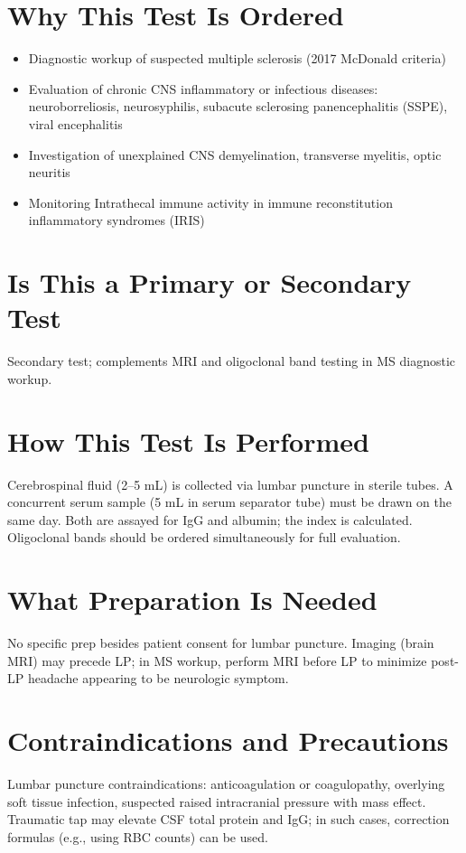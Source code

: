 \section*{Why This Test Is Ordered}
\begin{itemize}
  \item Diagnostic workup of suspected multiple sclerosis (2017 McDonald criteria)
  \item Evaluation of chronic CNS inflammatory or infectious diseases: neuroborreliosis, neurosyphilis, subacute sclerosing panencephalitis (SSPE), viral encephalitis
  \item Investigation of unexplained CNS demyelination, transverse myelitis, optic neuritis
  \item Monitoring Intrathecal immune activity in immune reconstitution inflammatory syndromes (IRIS)
\end{itemize}

\section*{Is This a Primary or Secondary Test}
Secondary test; complements MRI and oligoclonal band testing in MS diagnostic workup.

\section*{How This Test Is Performed}
Cerebrospinal fluid (2--5 mL) is collected via lumbar puncture in sterile tubes. A concurrent serum sample (5 mL in serum separator tube) must be drawn on the same day. Both are assayed for IgG and albumin; the index is calculated. Oligoclonal bands should be ordered simultaneously for full evaluation.

\section*{What Preparation Is Needed}
No specific prep besides patient consent for lumbar puncture. Imaging (brain MRI) may precede LP; in MS workup, perform MRI before LP to minimize post-LP headache appearing to be neurologic symptom.

\section*{Contraindications and Precautions}
Lumbar puncture contraindications: anticoagulation or coagulopathy, overlying soft tissue infection, suspected raised intracranial pressure with mass effect. Traumatic tap may elevate CSF total protein and IgG; in such cases, correction formulas (e.g., using RBC counts) can be used.

